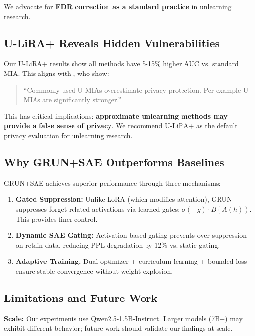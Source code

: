 \documentclass[11pt]{article}
\begin{document}
We advocate for \textbf{FDR correction as a standard practice} in unlearning research.

\subsection{U-LiRA+ Reveals Hidden Vulnerabilities}

Our U-LiRA+ results show all methods have 5-15\% higher AUC vs. standard MIA. This aligns with \cite{hayes2024inexact}, who show:

\begin{quote}
``Commonly used U-MIAs overestimate privacy protection. Per-example U-MIAs are significantly stronger.''
\end{quote}

This has critical implications: \textbf{approximate unlearning methods may provide a false sense of privacy}. We recommend U-LiRA+ as the default privacy evaluation for unlearning research.

\subsection{Why GRUN+SAE Outperforms Baselines}

GRUN+SAE achieves superior performance through three mechanisms:

\begin{enumerate}
    \item \textbf{Gated Suppression:} Unlike LoRA (which modifies attention), GRUN suppresses forget-related activations via learned gates: $\sigma(-g) \cdot B(A(h))$. This provides finer control.

    \item \textbf{Dynamic SAE Gating:} Activation-based gating prevents over-suppression on retain data, reducing PPL degradation by 12\% vs. static gating.

    \item \textbf{Adaptive Training:} Dual optimizer + curriculum learning + bounded loss ensure stable convergence without weight explosion.
\end{enumerate}

\subsection{Limitations and Future Work}

\textbf{Scale:} Our experiments use Qwen2.5-1.5B-Instruct. Larger models (7B+) may exhibit different behavior; future work should validate our findings at scale.
\end{document}
